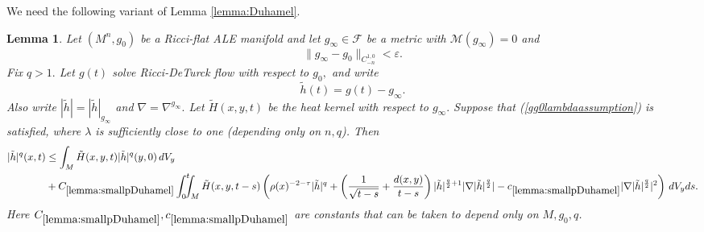 \documentclass[12pt]{amsart}
\newcommand{\calM}{\mathcal{M}}
\renewcommand{\1}{{\mathbf 1}}
\newcommand{\eps}{{\varepsilon}}
\newtheorem{lemma}[thm]{Lemma}
\theoremstyle{others}
\numberwithin{equation}{section}
\begin{document}
We need the following variant of Lemma \ref{lemma:Duhamel}.

\begin{lemma}\label{lemma:smallpDuhamel} %
{Let $(M^n, g_0)$ be a Ricci-flat ALE manifold} and let $g_\infty \in \mathcal{F}$ be a metric with $\calM(g_\infty) = 0$ and 
\begin{equation}\label{gaugedricciflatclose}
\|g_\infty - g_0 \|_{C^{1,0}_{-n}} < \eps.
\end{equation}
Fix $q > 1.$ Let $g(t)$ solve Ricci-DeTurck flow with respect to $g_0,$ and write
$$\tilde{h}(t) = g(t) - g_\infty.$$
Also write
$|\tilde{h}| = |\tilde{h}|_{g_\infty}$ and $\nabla = \nabla^{g_\infty}.$ Let $\tilde{H}(x,y,t)$ be the heat kernel with respect to $g_\infty.$ Suppose that (\ref{gg0lambdaassumption}) is satisfied, where $\lambda$ is sufficiently close to one {(depending only on $n, q$)}.
Then
        \begin{equation*}%
        \begin{split}
        |\tilde{h}|^q(x,t) & \leq \int_M \tilde{H}(x,y,t) |\tilde{h}|^q(y,0) \, dV_y \\
        & + C_{\ref{lemma:smallpDuhamel}} \int_0^t \!\!\!\! \int_M \tilde{H}(x,y,t - s) \left( \rho(x)^{-2 - \tau} |\tilde{h}|^q + \left( \frac{1}{\sqrt{t - s}} + \frac{d(x,y)}{t-s} \right) |\tilde{h}|^{\frac{q}{2} + 1} |\nabla |\tilde{h}|^{\frac{q}{2}} | - c_{\ref{lemma:smallpDuhamel}} |\nabla |\tilde{h}|^{\frac{q}{2}} |^2 \right) \, dV_y ds.
        \end{split}
    \end{equation*}
    Here $C_{\ref{lemma:smallpDuhamel}}, c_{\ref{lemma:smallpDuhamel}}$ are constants that can be taken to depend only on $M, g_0, q$.
\end{lemma}
\end{document}
